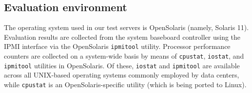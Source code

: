 \documentclass[prodmode,acmtaco,pdftex]{acmsmall}
\begin{document}
\subsection{Evaluation environment}
\label{sec:measurementtools}
The operating system used in our test servers is OpenSolaris (namely,
Solaris 11).  Evaluation results are collected from the system baseboard
controller using the IPMI interface via the OpenSolaris
\texttt{ipmitool} utility.  Processor performance counters are collected
on a system-wide basis by means of \texttt{cpustat}, \texttt{iostat},
and \texttt{ipmitool} utilities in OpenSolaris.  Of these,
\texttt{iostat} and \texttt{ipmitool} are available across all
UNIX-based operating systems commonly employed by data centers, while
\texttt{cpustat} is an OpenSolaris-specific utility (which is being
ported to Linux).
\begin{table}%
\end{table}
\end{document}
